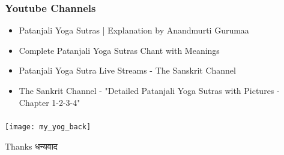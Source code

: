 \begin{frame}[fragile]\frametitle{Youtube Channels}



	\begin{itemize}
	\item Patanjali Yoga Sutras | Explanation by Anandmurti Gurumaa
	\item Complete Patanjali Yoga Sutras Chant with Meanings
	\item Patanjali Yoga Sutra Live Streams - The Sanskrit Channel
	\item The Sankrit Channel - "Detailed Patanjali Yoga Sutras with Pictures - Chapter 1-2-3-4"
	\end{itemize}

\end{frame}

\begin{frame}[fragile]\frametitle{}

\begin{center}
\texttt{[image: my\_yog\_back]}

Thanks धन्यवाद
\end{center}

\end{frame}
